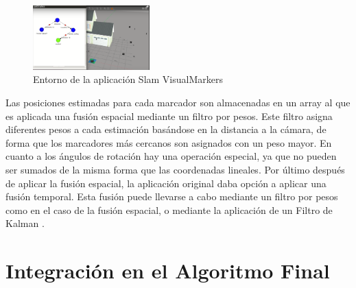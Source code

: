 \begin{figure}[H]
	\begin{center}
		\includegraphics[width=0.4\textwidth]{imag/IMG34.png}
				\caption{Entorno de la aplicación Slam VisualMarkers}
		\label{fig:Ejemplo Slam VisualMarkers.}	
	\end{center}
\end{figure}

\hspace{1cm} Las posiciones estimadas para cada marcador son almacenadas en un array al que es aplicada una fusión espacial mediante un filtro por pesos. Este filtro asigna diferentes pesos a cada estimación basándose en la distancia a la cámara, de forma que los marcadores más cercanos son asignados con un peso mayor. En cuanto a los ángulos de rotación hay una operación especial, ya que no pueden ser sumados de la misma forma que las coordenadas lineales. Por último después de aplicar la fusión espacial, la aplicación original daba opción a aplicar una fusión temporal.  Esta fusión puede llevarse a cabo mediante un filtro por pesos como en el caso de la fusión espacial, o mediante la aplicación de un Filtro de Kalman \cite{FiltroKalman}.

\section{Integración en el Algoritmo Final}